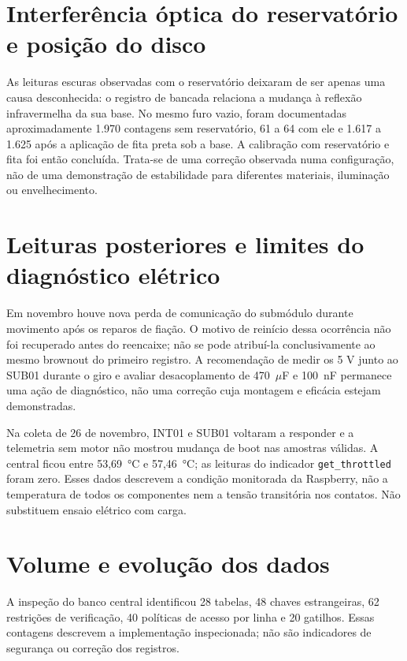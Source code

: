 
\section{Interferência óptica do reservatório e posição do disco}
As leituras escuras observadas com o reservatório deixaram de ser apenas uma causa desconhecida: o registro de bancada relaciona a mudança à reflexão infravermelha da sua base. No mesmo furo vazio, foram documentadas aproximadamente 1.970 contagens sem reservatório, 61 a 64 com ele e 1.617 a 1.625 após a aplicação de fita preta sob a base. A calibração com reservatório e fita foi então concluída. Trata-se de uma correção observada numa configuração, não de uma demonstração de estabilidade para diferentes materiais, iluminação ou envelhecimento. 

\section{Leituras posteriores e limites do diagnóstico elétrico}
Em novembro houve nova perda de comunicação do submódulo durante movimento após os reparos de fiação. O motivo de reinício dessa ocorrência não foi recuperado antes do reencaixe; não se pode atribuí-la conclusivamente ao mesmo brownout do primeiro registro. A recomendação de medir os 5 V junto ao SUB01 durante o giro e avaliar desacoplamento de 470~$\mu$F e 100~nF permanece uma ação de diagnóstico, não uma correção cuja montagem e eficácia estejam demonstradas. 

Na coleta de 26 de novembro, INT01 e SUB01 voltaram a responder e a telemetria sem motor não mostrou mudança de boot nas amostras válidas. A central ficou entre 53,69~°C e 57,46~°C; as leituras do indicador \texttt{get\_throttled} foram zero. Esses dados descrevem a condição monitorada da Raspberry, não a temperatura de todos os componentes nem a tensão transitória nos contatos. Não substituem ensaio elétrico com carga. 


\section{Volume e evolução dos dados}
A inspeção do banco central identificou 28 tabelas, 48 chaves estrangeiras, 62 restrições de verificação, 40 políticas de acesso por linha e 20 gatilhos. Essas contagens descrevem a implementação inspecionada; não são indicadores de segurança ou correção dos registros.

